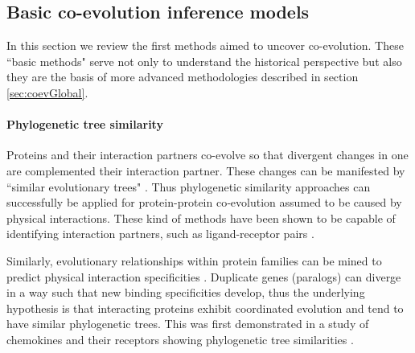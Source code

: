 \subsection{Basic co-evolution inference models}

In this section we review the first methods aimed to uncover co-evolution.
These ``basic methods" serve not only to understand the historical perspective but also they are the basis of more advanced methodologies described in section \ref{sec:coevGlobal}.

\paragraph{Phylogenetic tree similarity}
Proteins and their interaction partners co-evolve so that divergent changes in one are complemented their interaction partner. 
These changes can be manifested by ``similar evolutionary trees" \cite{goh2000co}.
Thus phylogenetic similarity approaches can successfully be applied for protein-protein co‐evolution assumed to be caused by physical interactions.
These kind of methods have been shown to be capable of identifying interaction partners, such as ligand-receptor pairs \cite{de2013emerging}.

Similarly, evolutionary relationships within protein families can be mined to predict physical interaction specificities \cite{ramani2003exploiting}.
Duplicate genes (paralogs) can diverge in a way such that new binding specificities develop, thus the underlying hypothesis is that interacting proteins exhibit coordinated evolution and tend to have similar phylogenetic trees.
This was first demonstrated in a study of chemokines and their receptors showing phylogenetic tree similarities \cite{goh2000co}.

